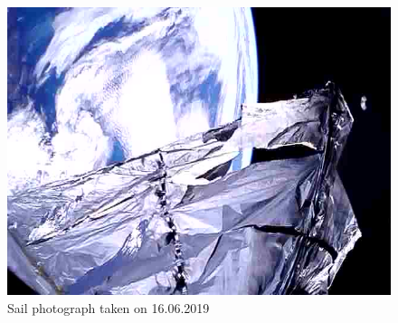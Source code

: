 \begin{figure}[H]
    \centering
    \includegraphics[width=0.65\paperwidth]{img/9/sail_photo.jpg}
    \caption{Sail photograph taken on 16.06.2019}
    \label{sail_photo}
\end{figure}